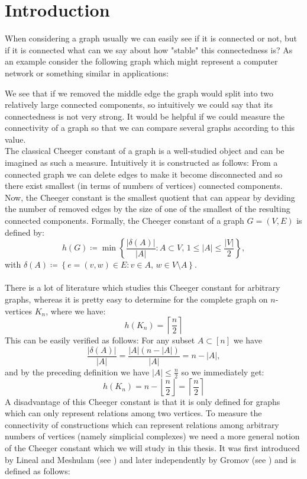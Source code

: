 
\chapter{Introduction}

\label{Introduction}
When considering a graph usually we can easily see if it is connected or not, but if it is connected what can we say about how "stable" this connectedness is? As an example consider the following graph which might represent a computer network or something similar in applications:



We see that if we removed the middle edge the graph would split into two relatively large connected components, so intuitively we could say that its connectedness is not very strong. It would be helpful if we could measure the connectivity of a graph so that we can compare several graphs according to this value.\\
The classical Cheeger constant of a graph is a well-studied object and can be imagined as such a measure. Intuitively it is constructed as follows: From a connected graph we can delete edges to make it become disconnected and so there exist smallest (in terms of numbers of vertices) connected components. Now, the Cheeger constant is the smallest quotient that can appear by deviding the number of removed edges by the size of one of the smallest of the resulting connected components. Formally, the Cheeger constant of a graph \(G=(V,E)\) is defined by:
\[
h(G)\coloneqq \min\left\{\frac{|\delta(A)|}{|A|}:A\subset V\text{, }1\leq |A|\leq\frac{|V|}{2}\right\},
\]
with \(\delta(A)\coloneqq \left\{e=(v,w)\in E:v\in A\text{, }w\in V\setminus A\right\}\).\\
\\
There is a lot of literature which studies this Cheeger constant for arbitrary graphs, whereas it is pretty easy to determine for the complete graph on \(n\)-vertices \(K_n\), where we have:
\[
h(K_n)=\left\lceil\frac{n}{2}\right\rceil
\]
This can be easily verified as follows: For any subset \(A\subset [n]\) we have
\[
\frac{|\delta(A)|}{|A|}=\frac{|A|(n-|A|)}{|A|}=n-|A|,
\]
and by the preceding definition we have \(|A|\leq\frac{n}{2}\) so we immediately get:
\[
h(K_n)=n-\left\lfloor\frac{n}{2}\right\rfloor=\left\lceil\frac{n}{2}\right\rceil
\]
A disadvantage of this Cheeger constant is that it is only defined for graphs which can only represent relations among two vertices. To measure the connectivity of constructions which can represent relations among arbitrary numbers of vertices (namely simplicial complexes) we need a more general notion of the Cheeger constant which we will study in this thesis. It was first introduced by Lineal and Meshulam (see \cite{2}) and later independently by Gromov (see \cite{3}) and is defined as follows:\\
